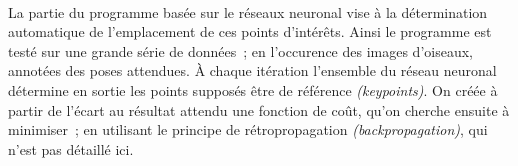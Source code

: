 \documentclass{article}
\begin{document}
\paragraph{} La partie du programme basée sur le réseaux neuronal vise à la détermination automatique de l'emplacement de ces points d'intérêts. Ainsi le programme est testé sur une grande série de données~; en l'occurence des images d'oiseaux, annotées des poses attendues. À chaque itération l'ensemble du réseau neuronal détermine en sortie les points supposés être de référence \textit{(keypoints)}. On créée à partir de l'écart au résultat attendu une fonction de coût, qu'on cherche ensuite à minimiser~; en utilisant le principe de rétropropagation \textit{(backpropagation)}, qui n'est pas détaillé ici.



\nocite{Branson:2014}


\end{document}
